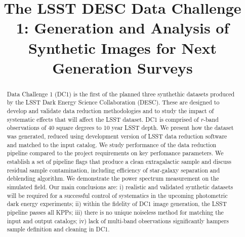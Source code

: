 \documentclass[twocolumn]{aastex62}
\newcommand{\as}[1]{{\textcolor{magenta}{{\textbf (AS: #1)}}}}
\begin{document}
\title[LSST DESC DC1]{The LSST DESC Data Challenge 1: Generation and Analysis of Synthetic Images for Next Generation Surveys }


\begin{abstract}
  Data Challenge 1 (DC1) is the first of the planned three synthethic
  datasets produced by the LSST Dark Energy Science Collaboration
  (DESC). These are designed to develop and validate data reduction
  methodologies and to study the impact of systematic effects that
  will affect the LSST dataset. DC1 is comprised of $r$-band
  observations of 40 square degrees to 10 year LSST depth. We present
  how the dataset was generated, reduced using development version of
  LSST data reduction software and matched to the input catalog. We
  study performance of the data reduction pipeline compared to the
  project requirements on key perfomance parameters. We establish a
  set of pipeline flags that produce a clean extragalactic sample and
  discuss residual sample contamination, including efficiency of
  star-galaxy separation and deblending algorithm. We demonstrate the
  power spectrum measurement on the simulated field. Our main
  conclusions are: i) realistic and validated synthetic datasets will
  be required for a successful control of systematics in the upcoming
  photometric dark energy experiments; ii) within the fidelity of DC1
  image generation, the LSST pipeline passes all KPPs; iii) there is
  no unique noiseless method for matching the input and output
  catalogs; iv) lack of multi-band observations significantly hampers
  sample definition and cleaning in DC1.

  


\end{abstract}
\end{document}

